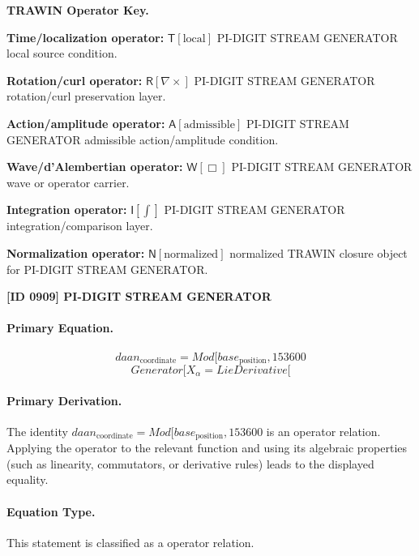 \par\vspace{0.45\baselineskip}
\noindent\begin{minipage}[t]{\linewidth}
\begingroup
\small
\raggedright
\textbf{TRAWIN Operator Key.}\par
\noindent\textbf{Time/localization operator:} $\mathsf{T}\!\left[\mathrm{local}\right]$ PI-DIGIT STREAM GENERATOR local source condition.\par
\noindent\textbf{Rotation/curl operator:} $\mathsf{R}\!\left[\nabla\times\right]$ PI-DIGIT STREAM GENERATOR rotation/curl preservation layer.\par
\noindent\textbf{Action/amplitude operator:} $\mathsf{A}\!\left[\mathrm{admissible}\right]$ PI-DIGIT STREAM GENERATOR admissible action/amplitude condition.\par
\noindent\textbf{Wave/d'Alembertian operator:} $\mathsf{W}\!\left[\Box\right]$ PI-DIGIT STREAM GENERATOR wave or operator carrier.\par
\noindent\textbf{Integration operator:} $\mathsf{I}\!\left[\int\right]$ PI-DIGIT STREAM GENERATOR integration/comparison layer.\par
\noindent\textbf{Normalization operator:} $\mathsf{N}\!\left[\mathrm{normalized}\right]$ normalized TRAWIN closure object for PI-DIGIT STREAM GENERATOR.\par
\endgroup
\end{minipage}

\clearpage
\noindent\textbf{[ID 0909] PI-DIGIT STREAM GENERATOR}\par
\vspace{0.35em}
\paragraph{Primary Equation.}
\[
daan_{\mathrm{coordinate}} = Mod[base_{\mathrm{position}}, 153600
\]
\[
Generator[X_\alpha = LieDerivative[
\]

\paragraph{Primary Derivation.}
The identity \( daan_{\mathrm{coordinate}} = Mod[base_{\mathrm{position}}, 153600 \) is an operator relation. Applying the operator to the relevant function and using its algebraic properties (such as linearity, commutators, or derivative rules) leads to the displayed equality.
\paragraph{Equation Type.}
This statement is classified as a operator relation.

